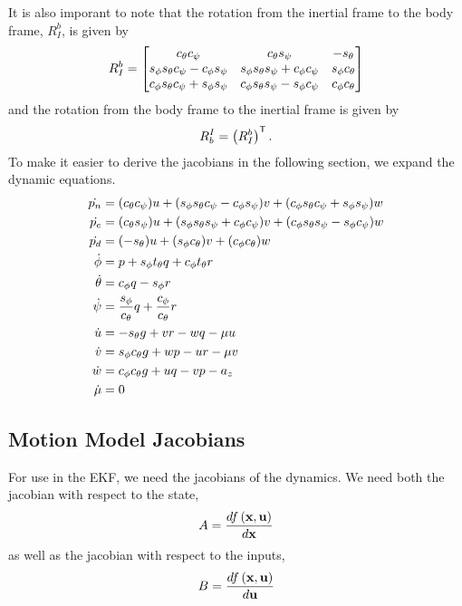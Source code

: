 It is also imporant to note that the rotation from the inertial frame to the
body frame, $R_I^b$, is given by
\begin{equation}
  R_I^b =
  \begin{bmatrix}
    c_\theta c_\psi & c_\theta s_\psi & -s_\theta \\
    s_\phi s_\theta c_\psi - c_\phi s_\psi & s_\phi s_\theta s_\psi + c_\phi
    c_\psi & s_\phi c_\theta \\
    c_\phi s_\theta c_\psi + s_\phi s_\psi & c_\phi s_\theta s_\psi - s_\phi
    c_\psi & c_\phi c_\theta
  \end{bmatrix}
\end{equation}
and the rotation from the body frame to the inertial frame is given by
\begin{equation}
  R_b^I = \left(R_I^b\right)^{\mathsf{T}}.
\end{equation}
To make it easier to derive the jacobians in the following section, we expand
the dynamic equations.
\begin{align}
  \dot{p_n} &= (c_\theta c_\psi)u + (s_\phi s_\theta c_\psi - c_\phi s_\psi)v +
    (c_\phi s_\theta c_\psi + s_\phi s_\psi)w \\
  \dot{p_e} &= (c_\theta s_\psi)u + (s_\phi s_\theta s_\psi + c_\phi c_\psi)v +
    (c_\phi s_\theta s_\psi - s_\phi c_\psi)w \\
  \dot{p_d} &= (-s_\theta)u + (s_\phi c_\theta)v + (c_\phi c_\theta)w \\
  \dot{\phi} &= p + s_\phi t_\theta q + c_\phi t_\theta r \\
  \dot{\theta} &= c_\phi q - s_\phi r \\
  \dot{\psi} &= \frac{s_\phi}{c_\theta} q + \frac{c_\phi}{c_\theta} r \\
  \dot{u} &= -s_\theta g + vr - wq - \mu u \\
  \dot{v} &= s_\phi c_\theta g + wp - ur - \mu v \\
  \dot{w} &= c_\phi c_\theta g + uq - vp - a_z \\
  \dot{\mu} &= 0
\end{align}

\subsection{Motion Model Jacobians}
For use in the EKF, we need the jacobians of the dynamics. We need both the
jacobian with respect to the state,
\begin{equation}
  A = \frac{d f\left(\boldsymbol{\mathrm{x}}, \boldsymbol{\mathrm{u}}\right)}{d \boldsymbol{\mathrm{x}}}
\end{equation}
as well as the jacobian with respect to the inputs,
\begin{equation}
  B = \frac{d f\left(\boldsymbol{\mathrm{x}}, \boldsymbol{\mathrm{u}}\right)}{d \boldsymbol{\mathrm{u}}}
\end{equation}

